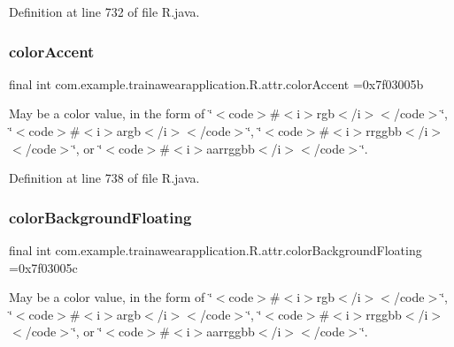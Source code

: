 Definition at line 732 of file R.\+java.

\mbox{\label{classcom_1_1example_1_1trainawearapplication_1_1_r_1_1attr_acbe3a1be6dcb1a93780b63de69fb8329}} 
\subsubsection{\texorpdfstring{colorAccent}{colorAccent}}
{\footnotesize\ttfamily final int com.\+example.\+trainawearapplication.\+R.\+attr.\+color\+Accent =0x7f03005b\hspace{0.3cm}{\ttfamily [static]}}

May be a color value, in the form of \char`\"{}$<$code$>$\#$<$i$>$rgb$<$/i$>$$<$/code$>$\char`\"{}, \char`\"{}$<$code$>$\#$<$i$>$argb$<$/i$>$$<$/code$>$\char`\"{}, \char`\"{}$<$code$>$\#$<$i$>$rrggbb$<$/i$>$$<$/code$>$\char`\"{}, or \char`\"{}$<$code$>$\#$<$i$>$aarrggbb$<$/i$>$$<$/code$>$\char`\"{}. 

Definition at line 738 of file R.\+java.

\mbox{\label{classcom_1_1example_1_1trainawearapplication_1_1_r_1_1attr_ac2b125d42fa995ac93e1989a8b157a95}} 
\subsubsection{\texorpdfstring{colorBackgroundFloating}{colorBackgroundFloating}}
{\footnotesize\ttfamily final int com.\+example.\+trainawearapplication.\+R.\+attr.\+color\+Background\+Floating =0x7f03005c\hspace{0.3cm}{\ttfamily [static]}}

May be a color value, in the form of \char`\"{}$<$code$>$\#$<$i$>$rgb$<$/i$>$$<$/code$>$\char`\"{}, \char`\"{}$<$code$>$\#$<$i$>$argb$<$/i$>$$<$/code$>$\char`\"{}, \char`\"{}$<$code$>$\#$<$i$>$rrggbb$<$/i$>$$<$/code$>$\char`\"{}, or \char`\"{}$<$code$>$\#$<$i$>$aarrggbb$<$/i$>$$<$/code$>$\char`\"{}. 

